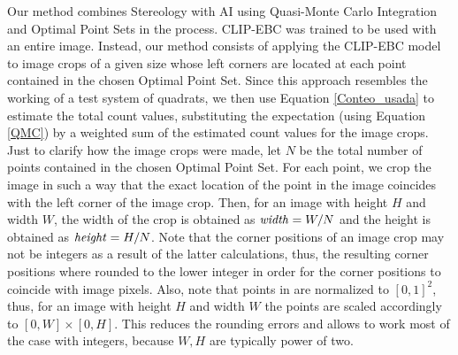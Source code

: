 Our method combines Stereology with AI using Quasi-Monte Carlo Integration and Optimal Point Sets in the process. CLIP-EBC was trained to be used with an entire image. Instead, our method consists of applying the CLIP-EBC model to image crops of a given size whose left corners are located at each point contained in the chosen Optimal Point Set. Since this approach resembles the working of a test system of quadrats, we then use Equation \ref{Conteo_usada} to estimate the total count values, substituting the expectation (using Equation \ref{QMC}) by a weighted sum of the estimated count values for the image crops.\\ 

Just to clarify how the image crops were made, let $N$ be the total number of points contained in the chosen Optimal Point Set. For each point, we crop the image in such a way that the exact location of the point in the image coincides with the left corner of the image crop. Then, for an image with height $H$ and width $W$, the width of the crop is obtained as $\text{\textit{width}} = W/N$ and the height is obtained as $\text{\textit{height}} = H/N$. Note that the corner positions of an image crop may not be integers as a result of the latter calculations, thus, the resulting corner positions where rounded to the lower integer in order for the corner positions to coincide with image pixels. Also, note that points in \cite{Hinrichs.pdf} are normalized to $[0,1]^2$, thus, for an image with height $H$ and width $W$ the points are scaled accordingly to $[0,W]\times [0,H]$.
This reduces the rounding errors and allows to work most of the case with integers, because $W,H$ are typically power of two.
\\




